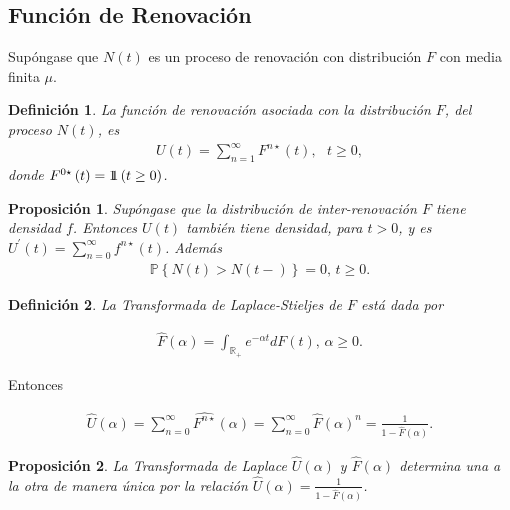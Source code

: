 \documentclass{article}
\newtheorem{Def}{Definición}
\newtheorem{Prop}{Proposición}
\newcommand{\rea}{\mathbb{R}}
\newcommand{\prob}{\mathbb{P}}
\newcommand{\indora}{\mbox{$1$\hspace{-0.8ex}$1$}}
\begin{document}
%
\subsection{Funci\'on de Renovaci\'on}
%


Sup\'ongase que $N\left(t\right)$ es un proceso de renovaci\'on con distribuci\'on $F$ con media finita $\mu$.

\begin{Def}
La funci\'on de renovaci\'on asociada con la distribuci\'on $F$, del proceso $N\left(t\right)$, es
\begin{eqnarray*}
U\left(t\right)=\sum_{n=1}^{\infty}F^{n\star}\left(t\right),\textrm{   }t\geq0,
\end{eqnarray*}
donde $F^{0\star}\left(t\right)=\indora\left(t\geq0\right)$.
\end{Def}


\begin{Prop}
Sup\'ongase que la distribuci\'on de inter-renovaci\'on $F$ tiene densidad $f$. Entonces $U\left(t\right)$ tambi\'en tiene densidad, para $t>0$, y es $U^{'}\left(t\right)=\sum_{n=0}^{\infty}f^{n\star}\left(t\right)$. Adem\'as
\begin{eqnarray*}
\prob\left\{N\left(t\right)>N\left(t-\right)\right\}=0\textrm{,   }t\geq0.
\end{eqnarray*}
\end{Prop}

\begin{Def}
La Transformada de Laplace-Stieljes de $F$ est\'a dada por

\begin{eqnarray*}
\hat{F}\left(\alpha\right)=\int_{\rea_{+}}e^{-\alpha t}dF\left(t\right)\textrm{,  }\alpha\geq0.
\end{eqnarray*}
\end{Def}

Entonces

\begin{eqnarray*}
\hat{U}\left(\alpha\right)=\sum_{n=0}^{\infty}\hat{F^{n\star}}\left(\alpha\right)=\sum_{n=0}^{\infty}\hat{F}\left(\alpha\right)^{n}=\frac{1}{1-\hat{F}\left(\alpha\right)}.
\end{eqnarray*}


\begin{Prop}
La Transformada de Laplace $\hat{U}\left(\alpha\right)$ y $\hat{F}\left(\alpha\right)$ determina una a la otra de manera \'unica por la relaci\'on $\hat{U}\left(\alpha\right)=\frac{1}{1-\hat{F}\left(\alpha\right)}$.
\end{Prop}
\end{document}
